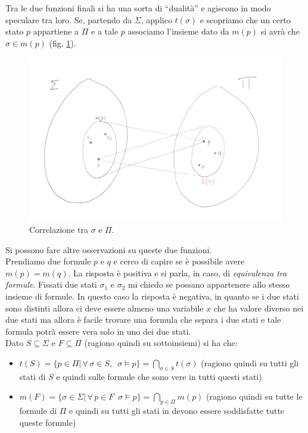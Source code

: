 				      				Tra le due funzioni finali si ha una sorta di ``dualità'' e agiscono in modo
				      				speculare tra loro. Se, partendo da $\Sigma$, applico $t(\sigma)$ e scopriamo
				      				che un certo stato $p$ appartiene a $\Pi$ e a tale $p$ associamo l'insieme dato
				      				da $m(p)$ si avrà che $\sigma\in m(p)$ (fig. \ref{fig:SigmaAndPi}).\\
				      				\begin{figure}[h]
                                        \centering \includegraphics[width=1\textwidth]{img/VENN.png}
                                        \caption{Correlazione tra $\sigma$ e $\Pi$.}
                                        \label{fig:SigmaAndPi}
                                    \end{figure}
				      				Si possono fare altre osservazioni su queste due funzioni. \\
				      				Prendiamo due formule $p$ e $q$ e cerco di capire se è possibile avere
				      				$m(p)=m(q)$. La risposta è positiva e si parla, in caso, di \textit{equivalenza
				      					tra formule}. Fissati due stati $\sigma_1$ e $\sigma_2$ mi chiedo se possano
				      				appartenere allo stesso insieme di formule. In questo caso la risposta è
				      				negativa, in quanto se i due stati sono distinti allora ci deve essere almeno
				      				una variabile $x$ che ha valore diverso nei due stati ma allora è facile trovare
				      				una formula che separa i due stati e tale formula potrà essere vera solo in uno
				      				dei due stati.\\
				      				Dato $S\subseteq \Sigma$ e $F\subseteq\Pi$ (ragiono quindi su sottoinsiemi) si
				      				ha che:
				      				\begin{itemize}
				      					\item $t(S)=\{p\in \Pi|\,\forall\,\sigma\in S,\,\,\,\sigma\vDash
				      					      p\}=\bigcap_{\sigma\in S}t(\sigma)$ (ragiono quindi su tutti gli stati di $S$
				      					      e quindi sulle formule che sono vere in tutti questi stati) 
				      					\item $m(F)=\{\sigma\in \Sigma|\,\forall\, p\in F\,\,\,\sigma\vDash
				      					      p\}=\bigcap_{p\in \Pi}m(p)$ (ragiono quindi su tutte le formule di $\Pi$
				      					      e quindi su tutti gli stati in devono essere soddisfatte tutte queste formule) 
				      				\end{itemize}

